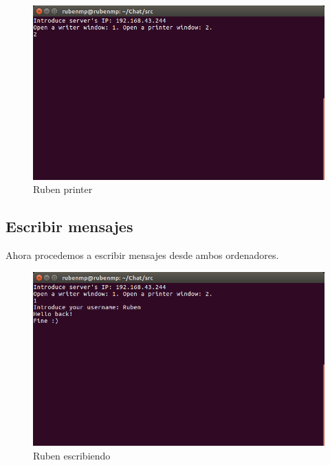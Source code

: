 \begin{figure}[H]
	\includegraphics[scale=0.65]{./Imagenes/rubenprinter1.png}
	\caption{Ruben printer}
\end{figure}


\subsection{Escribir mensajes}
Ahora procedemos a escribir mensajes desde ambos ordenadores.

\begin{figure}[H]
	\includegraphics[scale=0.65]{./Imagenes/rubenwriter2.png}
	\caption{Ruben escribiendo}
\end{figure}

\vspace{0.1cm}

